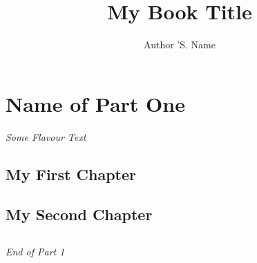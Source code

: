 \documentclass[
  11pt,       %
  twoside,    %
  openright   %
]{memoir}
\title{My Book Title}
\author{Author 'S. Name}
\date{}
\begin{document}

  \maketitle
  \cleartooddpage
  
  \cleartooddpage
  \tableofcontents
  \newpage


  \frontmatter

  \mainmatter


  \newpage
  \part{Name of Part One}
  \begin{center}
    \textnormal{\textit{Some Flavour Text}}
    \vfil
  \end{center}
  
  \chapter{My First Chapter}
  

  \chapter{My Second Chapter}
  

  \newpage
  \setcounter{oldpage}{\value{page}}
  \chapter*{}
  \begin{vplace}[0.5]
    \begin{center}
      \textnormal{\textit{End of Part 1}}
    \end{center}
  \end{vplace}
\end{document}
